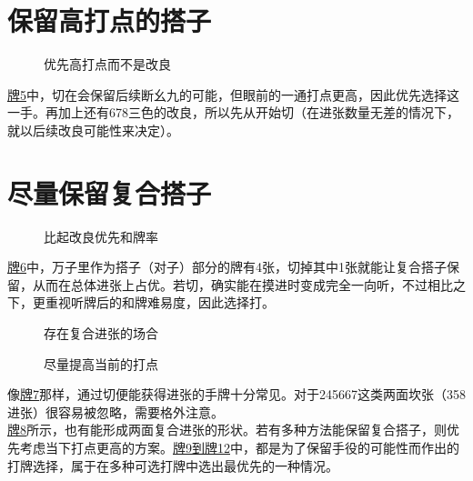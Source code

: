 \section{保留高打点的搭子}
\begin{figure}[h]
    \caption{优先高打点而不是改良}
    \label{lec6:pai5}
\end{figure}
\hyperlink{lec6:pai5}{牌5}中，切在会保留后续断幺九的可能，但眼前的一通打点更高，因此优先选择这一手。再加上还有678三色的改良，所以先从开始切（在进张数量无差的情况下，就以后续改良可能性来决定）。

\section{尽量保留复合搭子}
\begin{figure}[h]
    \caption{比起改良优先和牌率}
    \label{lec6:pai6}
\end{figure}
\hyperlink{lec6:pai6}{牌6}中，万子里作为搭子（对子）部分的牌有4张，切掉其中1张就能让复合搭子保留，从而在总体进张上占优。若切，确实能在摸进时变成完全一向听，不过相比之下，更重视听牌后的和牌难易度，因此选择打。

\begin{figure}[h]
    \caption{存在复合进张的场合}
    \label{lec6:pai7-8}
    \par\bigskip
\end{figure}
\begin{figure}
    \caption{尽量提高当前的打点}
    \label{lec6:pai9-12}
    \par\bigskip
    \par\bigskip
    \par\bigskip
\end{figure}

像\hyperlink{lec6:pai7-8}{牌7}那样，通过切便能获得进张的手牌十分常见。对于245667这类两面坎张（358进张）很容易被忽略，需要格外注意。\\
\hyperlink{lec6:pai7-8}{牌8}所示，也有能形成两面复合进张的形状。若有多种方法能保留复合搭子，则优先考虑当下打点更高的方案。\hyperlink{lec6:pai9-12}{牌9到牌12}中，都是为了保留手役的可能性而作出的打牌选择，属于在多种可选打牌中选出最优先的一种情况。

